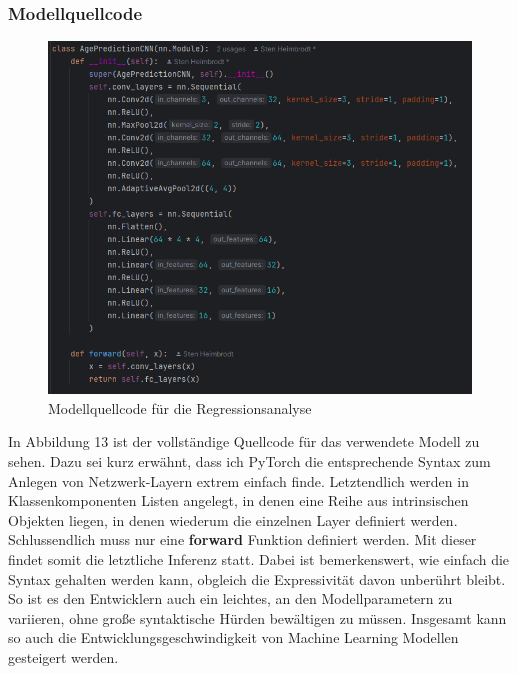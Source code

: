 \subsubsection{Modellquellcode}
\begin{figure}
    \centering
    \includegraphics[width=0.9\linewidth]{Screenshot 2025-03-30 164658.png}
    \caption{Modellquellcode für die Regressionsanalyse}
    \label{fig:enter-label}
\end{figure}
In Abbildung 13 ist der vollständige Quellcode für das verwendete Modell zu sehen. Dazu sei kurz erwähnt, dass ich PyTorch die entsprechende Syntax zum Anlegen von Netzwerk-Layern extrem einfach finde. Letztendlich werden in Klassenkomponenten Listen angelegt, in denen eine Reihe aus intrinsischen Objekten liegen, in denen wiederum die einzelnen Layer definiert werden. Schlussendlich muss nur eine \textbf{forward} Funktion definiert werden. Mit dieser findet somit die letztliche Inferenz statt. Dabei ist bemerkenswert, wie einfach die Syntax gehalten werden kann, obgleich die Expressivität davon unberührt bleibt. So ist es den Entwicklern auch ein leichtes, an den Modellparametern zu variieren, ohne große syntaktische Hürden bewältigen zu müssen. Insgesamt kann so auch die Entwicklungsgeschwindigkeit von Machine Learning Modellen gesteigert werden.

